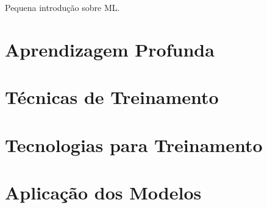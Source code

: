 Pequena introdução sobre ML.

\section{Aprendizagem Profunda}%

\section{Técnicas de Treinamento}%

\section{Tecnologias para Treinamento}%

\section{Aplicação dos Modelos}%

